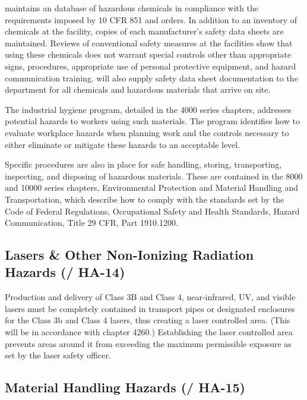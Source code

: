 \fnal maintains an database of hazardous chemicals in compliance
with the requirements imposed by 10 CFR 851 and  orders. In
addition to an inventory of chemicals at the facility, copies of each manufacturer's safety data sheets are
maintained. Reviews of conventional safety measures at the
facilities show that using these chemicals does not warrant special
controls other than appropriate signs, procedures, appropriate use of
personal protective equipment, and hazard communication training. 
will also supply safety data sheet documentation to the \surf {} department for all
chemicals and hazardous materials that arrive on site.

The industrial hygiene program, detailed in the  4000 series
chapters, addresses potential hazards to workers using such
materials. The program identifies how to evaluate workplace hazards
when planning work and the controls necessary to either eliminate or mitigate
these hazards to an acceptable level.

Specific procedures are also in place for safe handling, storing,
transporting, inspecting, and disposing of hazardous materials. These
are contained in the  8000 and 10000 series chapters,
Environmental Protection and Material Handling and Transportation,
which describe how to comply with the standards set by the Code of
Federal Regulations, Occupational Safety and Health Standards, Hazard
Communication, Title 29 CFR, Part 1910.1200.


\subsection{Lasers \& Other Non-Ionizing Radiation Hazards (/ HA-14)}

Production and delivery of Class 3B and Class 4, near-infrared, UV,
and visible lasers must be completely contained in
transport pipes or designated enclosures for the Class 3b and Class 4
lasers, thus creating a laser controlled area. (This will be in
accordance with \fnal {} chapter 4260.)  Establishing the laser controlled area
prevents areas around it from exceeding the maximum
permissible exposure as set by the \fnal laser safety officer.

\subsection{Material Handling Hazards (/ HA-15)}

